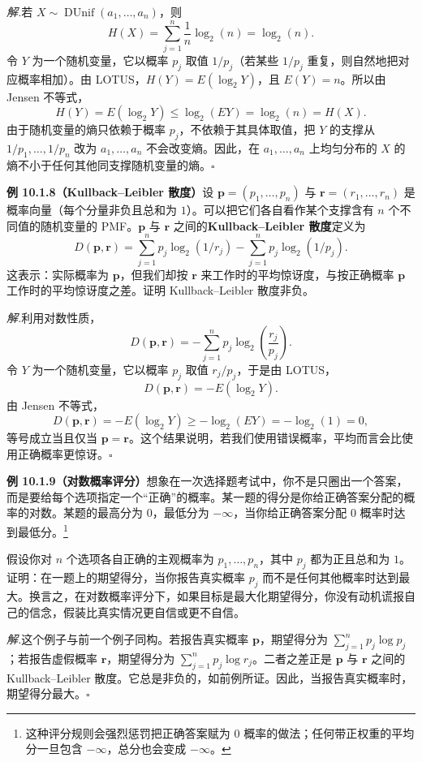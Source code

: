 \documentclass[UTF8, 12pt, fontset=fandol, oneside]{ctexart}
\begin{document}
\noindent\textit{解.}\quad 若 $X\sim\operatorname{DUnif}(a_1,\ldots,a_n)$，则
\[
  H(X)=\sum_{j=1}^n \frac1n\log_2(n)=\log_2(n).
\]
令 $Y$ 为一个随机变量，它以概率 $p_j$ 取值 $1/p_j$（若某些 $1/p_j$ 重复，则自然地把对应概率相加）。由 LOTUS，$H(Y)=E(\log_2 Y)$，且 $E(Y)=n$。所以由 Jensen 不等式，
\[
  H(Y)=E(\log_2 Y)\le \log_2(EY)=\log_2(n)=H(X).
\]
由于随机变量的熵只依赖于概率 $p_j$，不依赖于其具体取值，把 $Y$ 的支撑从 $1/p_1,\ldots,1/p_n$ 改为 $a_1,\ldots,a_n$ 不会改变熵。因此，在 $a_1,\ldots,a_n$ 上均匀分布的 $X$ 的熵不小于任何其他同支撑随机变量的熵。$\square$

\noindent\textbf{例 10.1.8（Kullback--Leibler 散度）}\quad 设 $\mathbf p=(p_1,\ldots,p_n)$ 与 $\mathbf r=(r_1,\ldots,r_n)$ 是概率向量（每个分量非负且总和为 $1$）。可以把它们各自看作某个支撑含有 $n$ 个不同值的随机变量的 PMF。$\mathbf p$ 与 $\mathbf r$ 之间的\textbf{Kullback--Leibler 散度}定义为
\[
  D(\mathbf p,\mathbf r)
  =\sum_{j=1}^n p_j\log_2(1/r_j)
  -\sum_{j=1}^n p_j\log_2(1/p_j).
\]
这表示：实际概率为 $\mathbf p$，但我们却按 $\mathbf r$ 来工作时的平均惊讶度，与按正确概率 $\mathbf p$ 工作时的平均惊讶度之差。证明 Kullback--Leibler 散度非负。

\noindent\textit{解.}\quad 利用对数性质，
\[
  D(\mathbf p,\mathbf r)
  =-\sum_{j=1}^n p_j\log_2\left(\frac{r_j}{p_j}\right).
\]
令 $Y$ 为一个随机变量，它以概率 $p_j$ 取值 $r_j/p_j$，于是由 LOTUS，
\[
  D(\mathbf p,\mathbf r)=-E(\log_2 Y).
\]
由 Jensen 不等式，
\[
  D(\mathbf p,\mathbf r)
  =-E(\log_2 Y)\ge -\log_2(EY)=-\log_2(1)=0,
\]
等号成立当且仅当 $\mathbf p=\mathbf r$。这个结果说明，若我们使用错误概率，平均而言会比使用正确概率更惊讶。$\square$

\noindent\textbf{例 10.1.9（对数概率评分）}\quad 想象在一次选择题考试中，你不是只圈出一个答案，而是要给每个选项指定一个“正确”的概率。某一题的得分是你给正确答案分配的概率的对数。某题的最高分为 $0$，最低分为 $-\infty$，当你给正确答案分配 $0$ 概率时达到最低分。\footnote{这种评分规则会强烈惩罚把正确答案赋为 $0$ 概率的做法；任何带正权重的平均分一旦包含 $-\infty$，总分也会变成 $-\infty$。}

假设你对 $n$ 个选项各自正确的主观概率为 $p_1,\ldots,p_n$，其中 $p_j$ 都为正且总和为 $1$。证明：在一题上的期望得分，当你报告真实概率 $p_j$ 而不是任何其他概率时达到最大。换言之，在对数概率评分下，如果目标是最大化期望得分，你没有动机谎报自己的信念，假装比真实情况更自信或更不自信。

\noindent\textit{解.}\quad 这个例子与前一个例子同构。若报告真实概率 $\mathbf p$，期望得分为 $\sum_{j=1}^n p_j\log p_j$；若报告虚假概率 $\mathbf r$，期望得分为 $\sum_{j=1}^n p_j\log r_j$。二者之差正是 $\mathbf p$ 与 $\mathbf r$ 之间的 Kullback--Leibler 散度。它总是非负的，如前例所证。因此，当报告真实概率时，期望得分最大。$\square$
\end{document}
